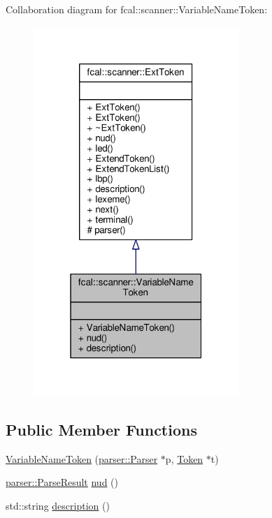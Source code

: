 Collaboration diagram for fcal\+:\+:scanner\+:\+:Variable\+Name\+Token\+:
\nopagebreak
\begin{figure}[H]
\begin{center}
\leavevmode
\includegraphics[width=220pt]{classfcal_1_1scanner_1_1VariableNameToken__coll__graph}
\end{center}
\end{figure}
\subsection*{Public Member Functions}
\begin{DoxyCompactItemize}
\item 
\hyperlink{classfcal_1_1scanner_1_1VariableNameToken_ab76c50eb69e6b72c5323868001f2bede}{Variable\+Name\+Token} (\hyperlink{classfcal_1_1parser_1_1Parser}{parser\+::\+Parser} $\ast$p, \hyperlink{classfcal_1_1scanner_1_1Token}{Token} $\ast$t)
\item 
\hyperlink{classfcal_1_1parser_1_1ParseResult}{parser\+::\+Parse\+Result} \hyperlink{classfcal_1_1scanner_1_1VariableNameToken_aff6fe66d29fa17a8efb5c54a93847524}{nud} ()
\item 
std\+::string \hyperlink{classfcal_1_1scanner_1_1VariableNameToken_acb8500279c7a3a25cf19f7f1aea52923}{description} ()
\end{DoxyCompactItemize}
